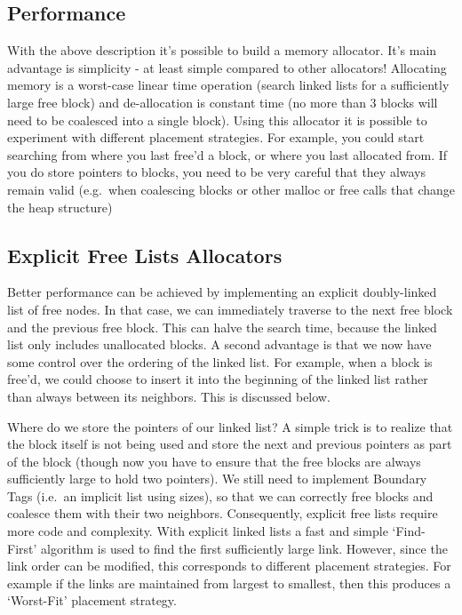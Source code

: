 \subsection{Performance}

With the above description it's possible to build a memory allocator. It's main advantage is simplicity - at least simple compared to other allocators! Allocating memory is a worst-case linear time operation (search linked lists for a sufficiently large free block) and de-allocation is constant time (no more than 3 blocks will need to be coalesced into a single block). Using this allocator it is possible to experiment with different placement strategies. For example, you could start searching from where you last free'd a block, or where you last allocated from. If you do store pointers to blocks, you need to be very careful that they always remain valid (e.g.~when coalescing blocks or other malloc or free calls that change the heap structure)

\subsection{Explicit Free Lists Allocators}

Better performance can be achieved by implementing an explicit doubly-linked list of free nodes. In that case, we can immediately traverse to the next free block and the previous free block. This can halve the search time, because the linked list only includes unallocated blocks. A second advantage is that we now have some control over the ordering of the linked list. For example, when a block is free'd, we could choose to insert it into the beginning of the linked list rather than always between its neighbors. This is discussed below.

Where do we store the pointers of our linked list? A simple trick is to realize that the block itself is not being used and store the next and previous pointers as part of the block (though now you have to ensure that the free blocks are always sufficiently large to hold two pointers). We still need to implement Boundary Tags (i.e.~an implicit list using sizes), so that we can correctly free blocks and coalesce them with their two neighbors. Consequently, explicit free lists require more code and complexity. With explicit linked lists a fast and simple `Find-First' algorithm is used to find the first sufficiently large link. However, since the link order can be modified, this corresponds to different placement strategies. For example if the links are maintained from largest to smallest, then this produces a `Worst-Fit' placement strategy.

